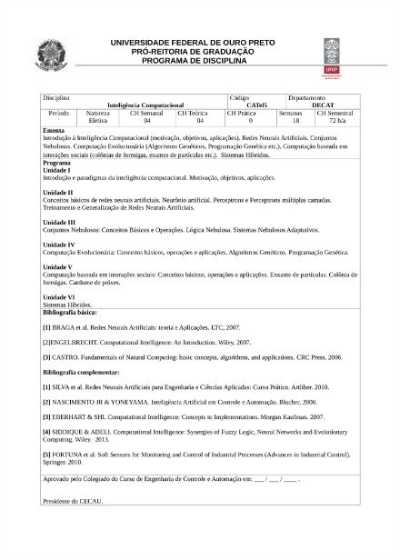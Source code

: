 \begin{figure}[p]
	\centering 
	\includegraphics[scale=0.7]{capitulos/anexo1-programas-disciplina/eg25.pdf}
\end{figure}


